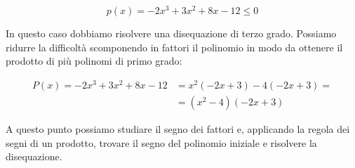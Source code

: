 \begin{esempio}
 \[p(x)=-2x^3+3x^2+8x-12 \le 0\]

In questo caso dobbiamo risolvere una disequazione di terzo grado. 
Possiamo ridurre la difficoltà scomponendo in fattori il polinomio in modo da 
ottenere il prodotto di più polinomi di primo grado: 

\begin{align*}
P(x) = -2x^3+3x^2+8x-12 &= x^2(-2x+3)-4(-2x+3) = \\
                        &= (x^2-4)(-2x+3)
\end{align*}

A questo punto possiamo studiare il segno dei fattori e, applicando la regola 
dei segni di un prodotto, trovare il segno del polinomio iniziale e risolvere 
la disequazione.


\end{esempio}
